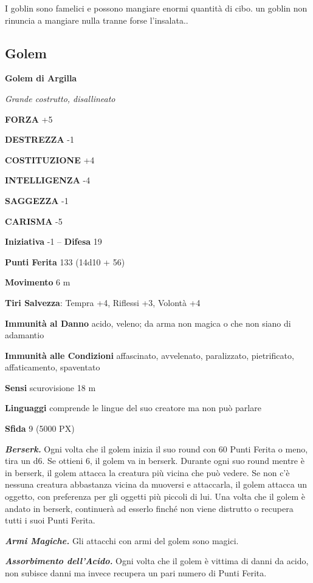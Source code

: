 \begin{multicols}{2}
	I goblin sono famelici e possono mangiare enormi quantità di cibo. un goblin non rinuncia a mangiare nulla tranne forse l'insalata..


	\subsection{Golem}

	\medskip{}\textbf{Golem di Argilla}

	\textit{Grande costrutto, disallineato}

	\textbf{FORZA} +5

	\textbf{DESTREZZA} -1

	\textbf{COSTITUZIONE} +4

	\textbf{INTELLIGENZA} -4

	\textbf{SAGGEZZA} -1

	\textbf{CARISMA} -5

	\textbf{Iniziativa} -1 -- \textbf{Difesa} 19

	\textbf{Punti Ferita} 133 (14d10 + 56)

	\textbf{Movimento} 6 m

	\textbf{Tiri Salvezza}: Tempra +4, Riflessi +3, Volontà +4

	\textbf{Immunità al Danno} acido, veleno; da arma non magica o che non siano di adamantio

	\textbf{Immunità alle Condizioni} affascinato, avvelenato, paralizzato, pietrificato, affaticamento, spaventato

	\textbf{Sensi} scurovisione 18 m

	\textbf{Linguaggi} comprende le lingue del suo creatore ma non può parlare

	\textbf{Sfida} 9 (5000 PX)

	\textit{\textbf{Berserk.}} Ogni volta che il golem inizia il suo round con 60 Punti Ferita o meno, tira un d6. Se ottieni 6, il golem va in berserk. Durante ogni suo round mentre è in berserk, il golem attacca la creatura più vicina che può vedere. Se non c'è nessuna creatura abbastanza vicina da muoversi e attaccarla, il golem attacca un oggetto, con preferenza per gli oggetti più piccoli di lui. Una volta che il golem è andato in berserk, continuerà ad esserlo finché non viene distrutto o recupera tutti i suoi Punti Ferita.

	\textit{\textbf{Armi Magiche.}} Gli attacchi con armi del golem sono magici.

	\textit{\textbf{Assorbimento dell'Acido.}} Ogni volta che il golem è vittima di danni da acido, non subisce danni ma invece recupera un pari numero di Punti Ferita.


\end{multicols}

